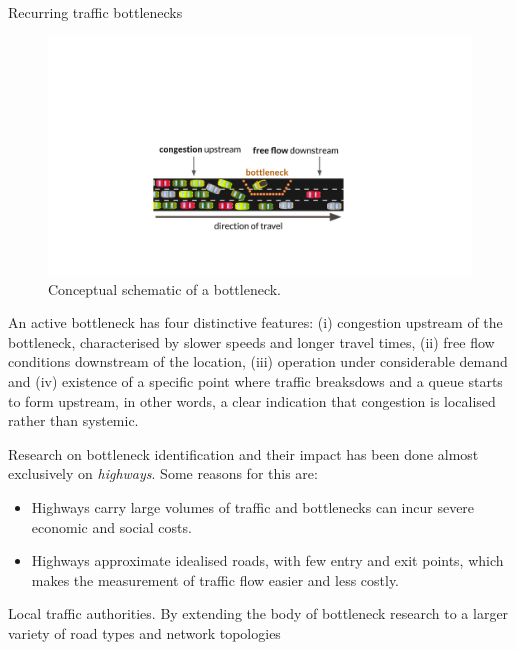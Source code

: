 \documentclass[final]{beamer}
\newlength{\colwidth}
\begin{document}
\begin{frame}[t]
\begin{columns}[t]
\begin{column}{\colwidth}
\begin{block}{Recurring traffic bottlenecks}

    \begin{figure}
      \vspace{-0.5cm}
      \includegraphics[width=0.95\linewidth]{bottleneck.pdf}
      \caption{Conceptual schematic of a bottleneck.}
      \label{fig:}
    \end{figure}

    An active bottleneck has four distinctive features:
    (i) congestion upstream of the bottleneck,
    characterised by slower speeds and longer travel times, (ii) free flow
    conditions downstream of the location, (iii) operation under
    considerable demand and (iv) existence of a specific point where traffic
    breaksdows and a queue starts to form upstream, in other words, a clear
    indication that congestion is localised rather than systemic.


    Research on bottleneck identification and their impact has been done
    almost exclusively on \emph{highways}. Some reasons for this are:

    \begin{itemize}
      \item Highways carry large volumes of traffic and bottlenecks can
            incur severe economic and social costs.
      \item Highways approximate idealised roads, with few entry and exit
            points, which makes the measurement of traffic flow easier and less
            costly.
    \end{itemize}

    Local traffic authorities. By extending the body of bottleneck research to
    a larger variety of road types and network topologies


\end{block}
\end{column}
\end{columns}
\end{frame}
\end{document}
